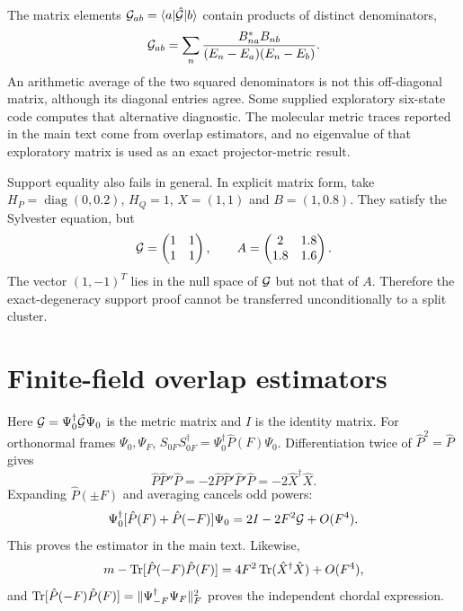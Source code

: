 \documentclass[aip,jcp,amsmath,amssymb,preprint,floatfix]{revtex4-1}
\begin{document}
The matrix elements $\mathcal G_{ab}=\langle a|\hat{\mathcal G}|b\rangle$ contain products of distinct denominators,
\begin{equation}
\mathcal G_{ab}=\sum_n\frac{B_{na}^*B_{nb}}{(E_n-E_a)(E_n-E_b)}.
\end{equation}
An arithmetic average of the two squared denominators is not this off-diagonal matrix, although its diagonal entries agree. Some supplied exploratory six-state code computes that alternative diagnostic. The molecular metric traces reported in the main text come from overlap estimators, and no eigenvalue of that exploratory matrix is used as an exact projector-metric result.

Support equality also fails in general. In explicit matrix form, take $H_P=\operatorname{diag}(0,0.2)$, $H_Q=1$, $X=(1,1)$ and $B=(1,0.8)$. They satisfy the Sylvester equation, but
\begin{equation}
\mathcal G=\begin{pmatrix}1&1\\1&1\end{pmatrix},\qquad
A=\begin{pmatrix}2&1.8\\1.8&1.6\end{pmatrix}.
\end{equation}
The vector $(1,-1)^T$ lies in the null space of $\mathcal G$ but not that of $A$. Therefore the exact-degeneracy support proof cannot be transferred unconditionally to a split cluster.

\section{Finite-field overlap estimators}\label{sec:overlap}
Here $\mathcal G=\Psi_0^\dagger\hat{\mathcal G}\Psi_0$ is the metric matrix and $I$ is the identity matrix. For orthonormal frames $\Psi_0,\Psi_F$, $S_{0F}S_{0F}^\dagger=\Psi_0^\dagger \hat{P}(F)\Psi_0$. Differentiation twice of $\hat{P}^2=\hat{P}$ gives
\begin{equation}
\hat{P} \hat{P}''\hat{P}=-2\hat{P} \hat{P}'\hat{P}'\hat{P}=-2\hat{X}^\dagger \hat{X}.
\end{equation}
Expanding $\hat{P}(\pm F)$ and averaging cancels odd powers:
\begin{equation}
\Psi_0^\dagger[\hat{P}(F)+\hat{P}(-F)]\Psi_0
=2I-2F^2\mathcal G+O(F^4).
\end{equation}
This proves the estimator in the main text. Likewise,
\begin{equation}
m-\operatorname{Tr}[\hat{P}(-F)\hat{P}(F)]
=4F^2\operatorname{Tr}(\hat{X}^\dagger \hat{X})+O(F^4),
\end{equation}
and $\operatorname{Tr}[\hat{P}(-F)\hat{P}(F)]=\|\Psi_{-F}^\dagger\Psi_F\|_F^2$ proves the independent chordal expression.
\end{document}
